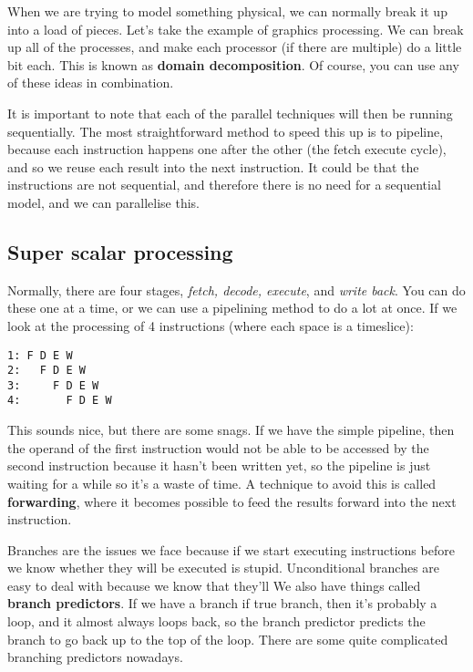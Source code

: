 \documentclass[11pt,a4paper,titlepage,dvipsnames,cmyk]{scrartcl}
\begin{document}
When we are trying to model something physical, we can normally break it
up into a load of pieces. Let's take the example of graphics processing.
We can break up all of the processes, and make each processor (if there
are multiple) do a little bit each. This is known as \textbf{domain
decomposition}. Of course, you can use any of these ideas in combination.

It is important to note that each of the parallel techniques will then be
running sequentially. The most straightforward method to speed this up is
to pipeline, because each instruction happens one after the other (the
fetch execute cycle), and so we reuse each result into the next
instruction. It could be that the instructions are not sequential, and
therefore there is no need for a sequential model, and we can parallelise
this. 

\subsection{Super scalar processing}%
\label{sub:Super scalar processing}


Normally, there are four stages, \textit{fetch, decode, execute}, and
\textit{write back}. You can do these one at a time, or we can use a
pipelining method to do a lot at once. If we look at the processing of 4
instructions (where each space is a timeslice):

\begin{lstlisting}
1: F D E W
2:   F D E W
3:     F D E W
4:       F D E W
\end{lstlisting}

This sounds nice, but there are some snags. If we have the simple
pipeline, then the operand of the first instruction would not be able to
be accessed by the second instruction because it hasn't been written yet,
so the pipeline is just waiting for a while so it's a waste of time. A
technique to avoid this is called \textbf{forwarding}, where it becomes
possible to feed the results forward into the next instruction.

Branches are the issues we face because if we start executing instructions
before we know whether they will be executed is stupid. Unconditional
branches are easy to deal with because we know that they'll We also have
things called \textbf{branch predictors}. If we have a branch if true
branch, then it's probably a loop, and it almost always loops back, so the
branch predictor predicts the branch to go back up to the top of the loop.
There are some quite complicated branching predictors nowadays.
\end{document}
